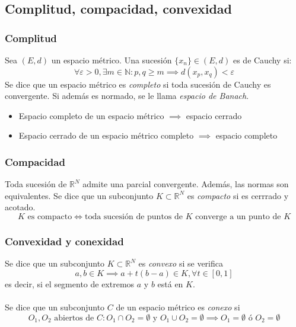 \documentclass[11pt,titlepage,a4paper]{article}
\begin{document}
\subsection{Complitud, compacidad, convexidad}
\subsubsection*{Complitud}
Sea $(E,d)$ un espacio métrico. Una sucesión $\{x_n\}\in(E,d)$ es de Cauchy si:
\begin{equation*}
\forall\varepsilon>0,\exists m\in\mathbb{N}: p,q\geq m\implies d(x_p,x_q)<\varepsilon
\end{equation*}
Se dice que un espacio métrico es \emph{completo} si toda sucesión de Cauchy es convergente. Si además es normado, se le llama \emph{espacio de Banach}.
\begin{itemize}
\item Espacio completo de un espacio métrico $\implies$ espacio cerrado
\item Espacio cerrado de un espacio métrico completo $\implies$ espacio completo
\end{itemize}

\subsubsection*{Compacidad}
Toda sucesión de $\mathbb{R}^N$ admite una parcial convergente. Además, las normas son equivalentes.
Se dice que un subconjunto $K\subset\mathbb{R}^N$ es \emph{compacto} si es cerrrado y acotado.
\begin{equation*}
K\text{ es compacto}\iff \text{toda sucesión de puntos de }K\text{ converge a un punto de }K
\end{equation*}

\subsubsection*{Convexidad y conexidad}
Se dice que un subconjunto $K\subset\mathbb{R}^N$ es \emph{convexo} si se verifica
\begin{equation*}
a,b\in K\implies a+t(b-a)\in K,\forall t\in[0,1]
\end{equation*}
es decir, si el segmento de extremos $a$ y $b$ está en $K$.\\\\
Se dice que un subconjunto $C$ de un espacio métrico es \emph{conexo} si 
\begin{equation*}
O_1,O_2 \text{ abiertos de } C: O_1\cap O_2=\emptyset\text{ y }
O_1\cup O_2=\emptyset\implies O_1=\emptyset\text{ ó }O_2=\emptyset
\end{equation*}
\end{document}

